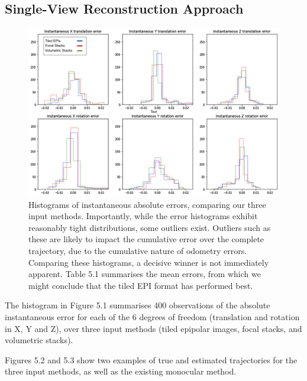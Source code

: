 \subsection{Single-View Reconstruction Approach}



\begin{figure}[H]
    \centering
    \includegraphics[width=\textwidth]{images/result-examples/pose/errors/sw_comparison_hist.png}
    \caption[Histograms of instantaneous errors for each input method, using single-view reconstruction]{Histograms of instantaneous absolute errors, comparing our three input methods. Importantly, while the error histograms exhibit reasonably tight distributions, some outliers exist. Outliers such as these are likely to impact the cumulative error over the complete trajectory, due to the cumulative nature of odometry errors. Comparing these histograms, a decisive winner is not immediately apparent. Table 5.1 summarises the mean errors, from which we might conclude that the tiled EPI format has performed best.}
\end{figure}

The histogram in Figure 5.1 summarises 400 observations of the absolute instantaneous error for each of the 6 degrees of freedom (translation and rotation in X, Y and Z), over three input methods (tiled epipolar images, focal stacks, and volumetric stacks). 

Figures 5.2 and 5.3 show two examples of true and estimated trajectories for the three input methods, as well as the existing monocular method. 

